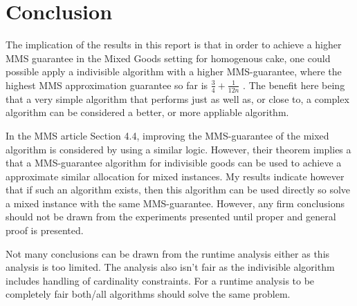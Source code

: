\chapter{Conclusion}\label{chp:conclusion}


The implication of the results in this report is that in order to achieve a higher MMS guarantee in the Mixed Goods setting for homogenous cake, one could possible apply a indivisible algorithm with a higher MMS-guarantee, where the highest MMS approximation guarantee so far is $\frac{3}{4}+\frac{1}{12n}$ \cite{best-mms}. The benefit here being that a very simple algorithm that performs just as well as, or close to, a complex algorithm can be considered a better, or more appliable algorithm. 

In the MMS article \cite{mms} Section 4.4, improving the MMS-guarantee of the mixed algorithm is considered by using a similar logic. However, their theorem implies a that a MMS-guarantee algorithm for indivisible goods can be used to achieve a approximate similar allocation for mixed instances. My results indicate however that if such an algorithm exists, then this algorithm can be used directly so solve a mixed instance with the same MMS-guarantee. However, any firm conclusions should not be drawn from the experiments presented until proper and general proof is presented.

Not many conclusions can be drawn from the runtime analysis either as this analysis is too limited. The analysis also isn't fair as the indivisible algorithm \cite{Allocations} includes handling of cardinality constraints. For a runtime analysis to be completely fair both/all algorithms should solve the same problem.

\clearpage
